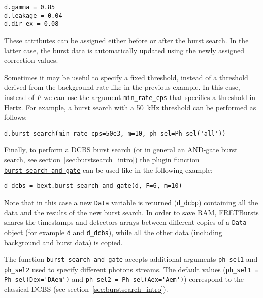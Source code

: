 \begin{verbatim}
d.gamma = 0.85
d.leakage = 0.04
d.dir_ex = 0.08
\end{verbatim}

These attributes can be assigned either before or after the burst search. In the
latter case, the burst data is
automatically updated using the newly assigned correction values.

Sometimes it may be useful to specify a fixed threshold, instead 
of a threshold derived from the background rate like in the previous example. In
this case, instead of $F$ we can use the argument \verb|min_rate_cps| that
specifies a threshold in Hertz. For example, a burst search with a 50~kHz
threshold can be performed as follows:

\begin{verbatim}
d.burst_search(min_rate_cps=50e3, m=10, ph_sel=Ph_sel('all'))
\end{verbatim}

Finally, to perform a DCBS burst search (or in general an AND-gate burst search,
see section~\ref{sec:burstsearch_intro}) the plugin function 
\href{http://fretbursts.readthedocs.org/en/latest/plugins.html#fretbursts.burstlib\_ext.burst\_search\_and\_gate}{\texttt{burst\_search\_and\_gate}}
can be used like in the following example:

\begin{verbatim}
d_dcbs = bext.burst_search_and_gate(d, F=6, m=10)
\end{verbatim}

Note that in this case a new \verb|Data| variable is returned (\verb|d_dcbp|)
containing all the data and the results of the new burst search. In order to
save RAM, FRETBursts shares the timestamps and detectors arrays between
different copies of a \verb|Data| object (for example \verb|d| and
\verb|d_dcbs|), while all the other data (including background and burst data)
is copied. 

The function \verb|burst_search_and_gate| accepts additional arguments
\verb|ph_sel1| and \verb|ph_sel2| 
used to specify different photons streams. The default values 
(\verb|ph_sel1 = Ph_sel(Dex='DAem')| and \verb|ph_sel2 = Ph_sel(Aex='Aem')|)
correspond to the classical DCBS 
(see section~\ref{sec:burstsearch_intro}).


